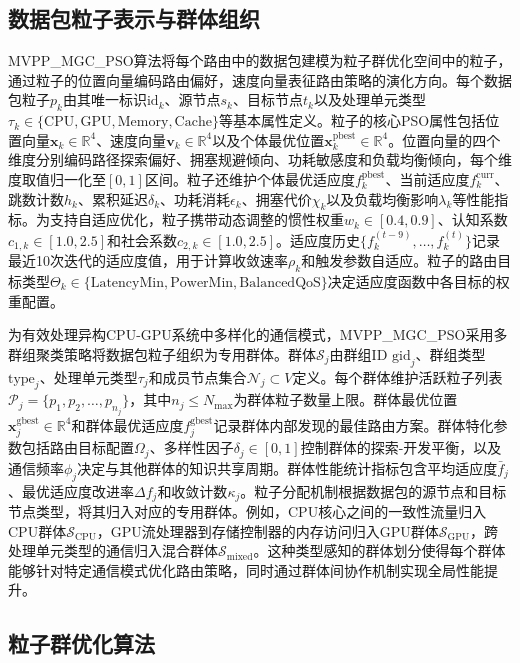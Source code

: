 \subsection{数据包粒子表示与群体组织}

MVPP\_MGC\_PSO算法将每个路由中的数据包建模为粒子群优化空间中的粒子，通过粒子的位置向量编码路由偏好，速度向量表征路由策略的演化方向。每个数据包粒子$p_k$由其唯一标识$\text{id}_k$、源节点$s_k$、目标节点$t_k$以及处理单元类型$\tau_k \in \{\text{CPU}, \text{GPU}, \text{Memory}, \text{Cache}\}$等基本属性定义。粒子的核心PSO属性包括位置向量$\mathbf{x}_k \in \mathbb{R}^4$、速度向量$\mathbf{v}_k \in \mathbb{R}^4$以及个体最优位置$\mathbf{x}_k^{\text{pbest}} \in \mathbb{R}^4$。位置向量的四个维度分别编码路径探索偏好、拥塞规避倾向、功耗敏感度和负载均衡倾向，每个维度取值归一化至$[0, 1]$区间。粒子还维护个体最优适应度$f_k^{\text{pbest}}$、当前适应度$f_k^{\text{curr}}$、跳数计数$h_k$、累积延迟$\delta_k$、功耗消耗$\epsilon_k$、拥塞代价$\chi_k$以及负载均衡影响$\lambda_k$等性能指标。为支持自适应优化，粒子携带动态调整的惯性权重$w_k \in [0.4, 0.9]$、认知系数$c_{1,k} \in [1.0, 2.5]$和社会系数$c_{2,k} \in [1.0, 2.5]$。适应度历史$\{f_k^{(t-9)}, \ldots, f_k^{(t)}\}$记录最近10次迭代的适应度值，用于计算收敛速率$\rho_k$和触发参数自适应。粒子的路由目标类型$\Theta_k \in \{\text{LatencyMin}, \text{PowerMin}, \text{BalancedQoS}\}$决定适应度函数中各目标的权重配置。

为有效处理异构CPU-GPU系统中多样化的通信模式，MVPP\_MGC\_PSO采用多群组聚类策略将数据包粒子组织为专用群体。群体$\mathcal{S}_j$由群组ID $\text{gid}_j$、群组类型$\text{type}_j$、处理单元类型$\tau_j$和成员节点集合$\mathcal{N}_j \subset V$定义。每个群体维护活跃粒子列表$\mathcal{P}_j = \{p_1, p_2, \ldots, p_{n_j}\}$，其中$n_j \leq N_{\max}$为群体粒子数量上限。群体最优位置$\mathbf{x}_j^{\text{gbest}} \in \mathbb{R}^4$和群体最优适应度$f_j^{\text{gbest}}$记录群体内部发现的最佳路由方案。群体特化参数包括路由目标配置$\Omega_j$、多样性因子$\delta_j \in [0, 1]$控制群体的探索-开发平衡，以及通信频率$\phi_j$决定与其他群体的知识共享周期。群体性能统计指标包含平均适应度$\bar{f}_j$、最优适应度改进率$\Delta f_j$和收敛计数$\kappa_j$。粒子分配机制根据数据包的源节点和目标节点类型，将其归入对应的专用群体。例如，CPU核心之间的一致性流量归入CPU群体$\mathcal{S}_{\text{CPU}}$，GPU流处理器到存储控制器的内存访问归入GPU群体$\mathcal{S}_{\text{GPU}}$，跨处理单元类型的通信归入混合群体$\mathcal{S}_{\text{mixed}}$。这种类型感知的群体划分使得每个群体能够针对特定通信模式优化路由策略，同时通过群体间协作机制实现全局性能提升。

\subsection{粒子群优化算法}

